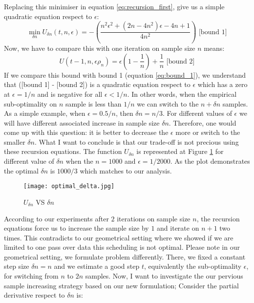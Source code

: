 \documentclass{article}
\begin{document}
 Replacing this minimiser in equation \ref{eq:recursion_first}, give
us a simple quadratic equation respect to $\epsilon$:
\begin{equation}
	 \min_{\delta n} U_{\delta n}(t,n,\epsilon) = 
	-(\frac{n^2\epsilon^2  +(2 n- 4 n^2) \epsilon  - 4 n + 1}{4 n^2})
	\text{   [bound 1]}\label{eq:bound_1}
\end{equation}
Now, we have to compare this with one iteration on sample size $n$ means: 
\begin{equation*}
	U \left(t-1,n, \epsilon \rho_n \right) = \epsilon(1-\frac{1}{n}) + \frac{1}{n}
	\text{   [bound 2]} \label{eq:bound_2}
\end{equation*}
If we compare this bound with bound 1 (equation \ref{eq:bound_1}), we understand
that ([bound 1] - [bound 2]) is a quadratic equation respect to $\epsilon$ which
has a zero at $\epsilon = 1/n$ and is negative for all $\epsilon <
1/n$.
In other words, when the empirical sub-optimality on
$n$ sample is less than $1/n$ we can switch to the $n + \delta n$ samples.
As a simple example, when $\epsilon = 0.5/n$, then $\delta n = n/3$. For
different values of $\epsilon$ we will have different associated increase in
sample size $\delta n$. Therefore, one would come up with this question: it
is better to decrease the $\epsilon$ more or switch to the smaller $\delta n$.
What I want to conclude is that our trade-off is not precious using these
recursion equations. The function $U_{\delta n}$ is represented at Figure
\ref{fig:delta_n_plot} for different value of $\delta n$ when the $n = 1000$ and $\epsilon = 1/2000$. As the plot demonstrates the optimal $\delta n$ is $1000/3$ which matches to our analysis.
\begin{figure}
\center
\texttt{[image: optimal\_delta.jpg]} 
\caption{$U_{\delta n}$ VS $\delta n$}
\label{fig:delta_n_plot}
\end{figure}
According to our experiments after $2$ iterations on sample size $n$, the
recursion equations force us to increase the sample size by $1$ and iterate on
$n+1$ two times. This contradicts to our geometrical setting where we
showed if we are limited to one pass over data this scheduling is not optimal.
Please note in our geometrical setting, we formulate problem differently.
There, we fixed a constant step size $\delta n = n$ and we estimate a good step $t$, equivalently the sub-optimality $\epsilon$, for switching from
$n$ to $2n$ samples.
Now, I want to investigate the our pervious sample increasing strategy based on
our new formulation; Consider the partial derivative respect to $\delta n$ is:
\end{document}
